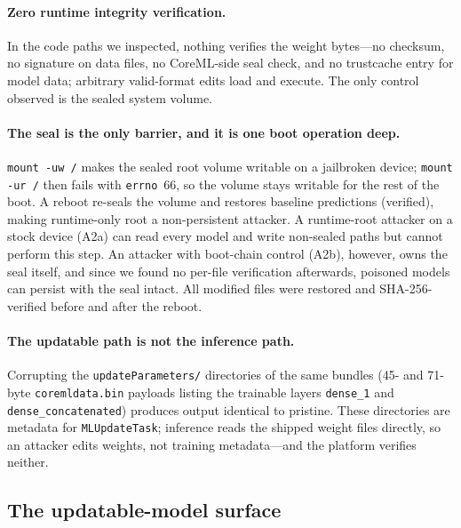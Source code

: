 \documentclass[letterpaper,twocolumn,10pt]{article}
\begin{document}
\paragraph{Zero runtime integrity verification.}
In the code paths we inspected, nothing verifies the weight bytes---no
checksum, no signature on data files, no CoreML-side seal check, and no
trustcache entry for model data; arbitrary valid-format edits load and
execute.
The only control observed is the sealed system volume.

\paragraph{The seal is the only barrier, and it is one boot operation
deep.}
\texttt{mount -uw /} makes the sealed root volume writable on a jailbroken
device; \texttt{mount -ur /} then fails with \texttt{errno}~66, so the
volume stays writable for the rest of the boot.
A reboot re-seals the volume and restores baseline predictions (verified),
making runtime-only root a non-persistent attacker.
A runtime-root attacker on a stock device (A2a) can read every model and
write non-sealed paths but cannot perform this step.
An attacker with boot-chain control (A2b), however, owns the seal itself,
and since we found no per-file verification afterwards, poisoned models
can persist with the seal intact.
All modified files were restored and SHA-256-verified before and after the
reboot.

\paragraph{The updatable path is not the inference path.}
Corrupting the \texttt{update}\allowbreak\texttt{Parameters/} directories of the same bundles
(45- and 71-byte \texttt{coremldata.bin} payloads listing the trainable
layers \texttt{dense\_1} and \texttt{dense\_concatenated}) produces output
identical to pristine.
These directories are metadata for \texttt{MLUpdateTask}; inference reads
the shipped weight files directly, so an attacker edits weights, not
training metadata---and the platform verifies neither.

\subsection{The updatable-model surface}
\label{sec:updatables}
\end{document}
